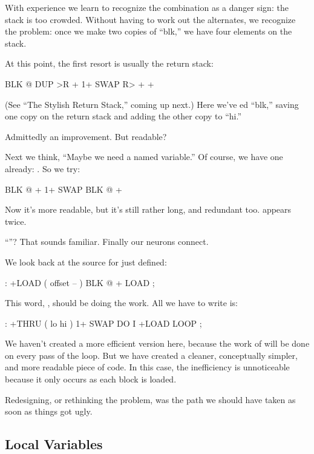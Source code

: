With experience we learn to recognize the combination  as
a danger sign: the stack is too crowded. Without having to work out the
alternates, we recognize the problem: once we make two copies of ``blk,''
we have four elements on the stack.

\medbreak
At this point, the first resort is usually the return stack:

\begin{Code}
BLK @  DUP >R  + 1+  SWAP R> + +
\end{Code}
(See ``The Stylish Return Stack,'' coming up next.) Here we've ed
``blk,'' saving one copy on the return stack and adding the other copy to
``hi.''

Admittedly an improvement. But readable?

Next we think, ``Maybe we need a named variable.'' Of course, we
have one already: . So we try:

\begin{Code}
BLK @  + 1+  SWAP BLK @ +
\end{Code}
Now it's more readable, but it's still rather long, and redundant too.
 appears twice.

``''? That sounds familiar. Finally our neurons connect.

We look back at the source for  just defined:

\begin{Code}
: +LOAD  ( offset -- )  BLK @ +  LOAD ;
\end{Code}
This word, , should be doing the work. All we have to write is:

\begin{Code}
: +THRU  ( lo hi )  1+ SWAP  DO  I +LOAD  LOOP ;
\end{Code}
We haven't created a more efficient version here, because the work of
 will be done on every pass of the loop. But we have
created a cleaner, conceptually simpler, and more readable piece of code.
In this case, the inefficiency is unnoticeable because it only occurs as
each block is loaded.

Redesigning, or rethinking the problem, was the path we should
have taken as soon as things got ugly.%

\subsection{Local Variables}%
%
%
%
%

